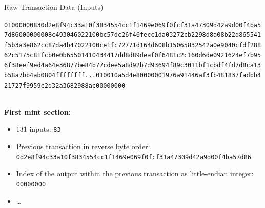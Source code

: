 \documentclass[]{beamer}
\begin{document}
\begin{frame}{Raw Transaction Data (Inputs)}
\begin{scriptsize}
\texttt{\textcolor{black!50}{01000000}{\alert<1>{83}\alert<2>{0d2e8f94c33a10f3834554cc1f1469e069f0fcf31a47309d42a9d00f4ba5
7d86}\alert<3>{00000000}}\textcolor{black!50}{8c493046022100bc57dc26f46fecc1da03272cb2298d8a08b22d865541
f5b3a3e862cc87da4b47022100ce1fc72771d164d608b15065832542a0e9040cfdf288
62c5175c81fcb0e0b65501410434417dd8d89deaf0f6481c2c160d6de0921624ef7b95
6f38eef9ed4a64e36877be84b77cdee5a8d92b7d93694f89c3011bf1cbdf4fd7d8ca13
b58a7bb4ab0804ffffffff...010010a5d4e80000001976a91446af3fb481837fadbb4
21727f9959c2d32a3682988ac00000000}}
\end{scriptsize}
\vspace{1em}
\scriptsize \\
\textbf{First mint section:}\\
\begin{itemize}
	\item \alert<1>{131 inputs: \texttt{83}}
	\item \alert<2>{Previous transaction in reverse byte order: \texttt{0d2e8f94c33a10f3834554cc1f1469e069f0fcf31a47309d42a9d00f4ba57d86}}
	\item \alert<3>{Index of the output within the previous transaction as little-endian integer: \texttt{00000000}}
	\item \dots
\end{itemize}
\end{frame}
\end{document}
